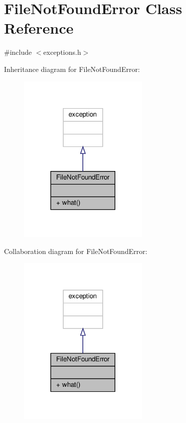 \hypertarget{classFileNotFoundError}{}\section{File\+Not\+Found\+Error Class Reference}
\label{classFileNotFoundError}


{\ttfamily \#include $<$exceptions.\+h$>$}



Inheritance diagram for File\+Not\+Found\+Error\+:\nopagebreak
\begin{figure}[H]
\begin{center}
\leavevmode
\includegraphics[width=176pt]{classFileNotFoundError__inherit__graph}
\end{center}
\end{figure}


Collaboration diagram for File\+Not\+Found\+Error\+:\nopagebreak
\begin{figure}[H]
\begin{center}
\leavevmode
\includegraphics[width=176pt]{classFileNotFoundError__coll__graph}
\end{center}
\end{figure}
